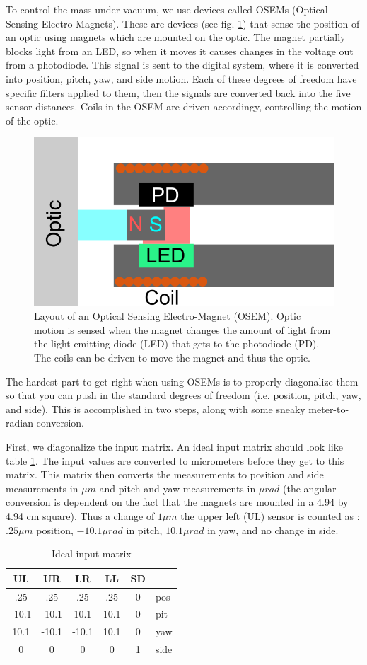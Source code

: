 To control the mass under vacuum, we use devices called OSEMs (Optical Sensing Electro-Magnets). These are devices (see fig. \ref{fig:osem}) that sense the position of an optic using magnets which are mounted on the optic. The magnet partially blocks light from an LED, so when it moves it causes changes in the voltage out from a photodiode. This signal is sent to the digital system, where it is converted into position, pitch, yaw, and side motion. Each of these degrees of freedom have specific filters applied to them, then the signals are converted back into the five sensor distances. Coils in the OSEM are driven accordingy, controlling the motion of the optic.

\begin{figure}[hp]
	\centering
		\includegraphics[width=.5\textwidth]{figures/suspensions/OSEM.png}
	\caption[OSEM diagram]{Layout of an Optical Sensing Electro-Magnet (OSEM). Optic motion is sensed when the magnet changes the amount of light from the light emitting diode (LED) that gets to the photodiode (PD). The coils can be driven to move the magnet and thus the optic.}
	\label{fig:osem}
\end{figure}

The hardest part to get right when using OSEMs is to properly diagonalize them so that you can push in the standard degrees of freedom (i.e. position, pitch, yaw, and side). This is accomplished in two steps, along with some sneaky meter-to-radian conversion. 

First, we diagonalize the input matrix. An ideal input matrix should look like table \ref{tab:idealDiag}. The input values are converted to micrometers before they get to this matrix. This matrix then converts the measurements to position and side measurements in $\mu m$ and pitch and yaw measurements in $\mu rad$ (the angular conversion is dependent on the fact that the magnets are mounted in a 4.94 by 4.94 cm square). Thus a change of $1 \mu m$ the upper left (UL) sensor is counted as : $.25 \mu m$ position, $-10.1 \mu rad$ in pitch, $10.1 \mu rad$ in yaw, and no change in side.

\begin{table}[hp]
\centering
\begin{tabular}{| c | c | c |c | c | l}
\bf{UL}& \bf{UR} & \bf{LR}  & \bf{LL} & \bf{SD}\\ \hline
  .25 & .25 & .25 & .25 & 0 &pos\\
 -10.1 &-10.1 & 10.1 & 10.1 & 0 &pit\\
  10.1 &-10.1 &-10.1 & 10.1 & 0 &yaw\\
  0 & 0 & 0 & 0 & 1 &side\\ \hline
\end{tabular}
\caption[Ideal diagonalization]{Ideal input matrix}
\label{tab:idealDiag}
\end{table}

